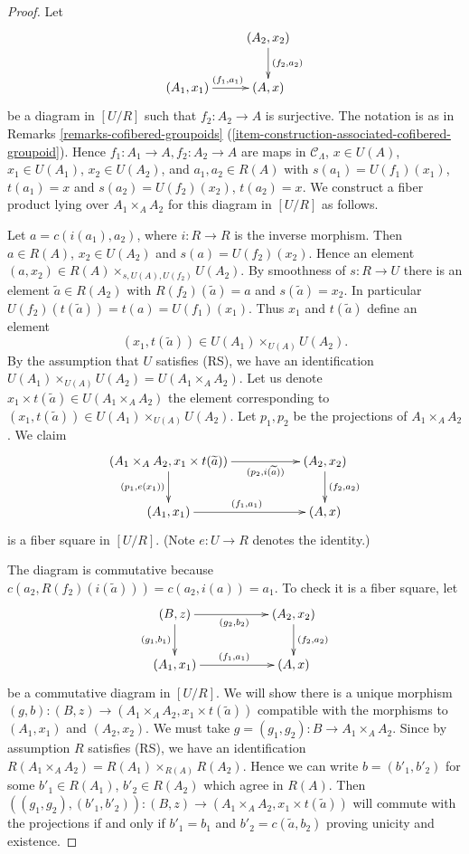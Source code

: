 \documentclass[10pt,a4paper]{amsart}
\theoremstyle{plain}
\theoremstyle{definition}
\theoremstyle{remark}
\numberwithin{equation}{subsection}
\begin{document}
\begin{proof}
Let
$$
\xymatrix{
                           &     (A_2, x_2) \ar[d]^{(f_2, a_2)} \\
(A_1, x_1) \ar[r]^{(f_1, a_1)} &     (A, x)
}
$$
be a diagram in $[U/R]$ such that $f_2: A_2 \to A$ is surjective. The
notation is as in
Remarks \ref{remarks-cofibered-groupoids}
(\ref{item-construction-associated-cofibered-groupoid}).
Hence $f_1: A_1 \to A, f_2: A_2 \to A$ are maps in
$\mathcal{C}_\Lambda$, $x \in U(A)$, $x_1 \in U(A_1)$, $x_2 \in U(A_2)$,
and $a_1, a_2 \in R(A)$ with $s(a_1) = U(f_1)(x_1)$,
$t(a_1) = x$ and $s(a_2) = U(f_2)(x_2)$, $t(a_2) = x$.
We construct a fiber product lying over $A_1 \times_A A_2$
for this diagram in $[U/R]$ as follows.

\medskip\noindent
Let $a = c(i(a_1), a_2)$, where $i: R \to R$ is the inverse morphism.
Then $a \in R(A)$, $x_2 \in U(A_2)$ and $s(a) = U(f_2)(x_2)$.
Hence an element $(a, x_2) \in R(A) \times_{s, U(A), U(f_2)} U(A_2)$.
By smoothness of $s : R \to U$ there is an element
$\widetilde{a} \in R(A_2)$ with $R(f_2)(\widetilde{a}) = a$ and
$s(\widetilde{a}) = x_2$. In particular
$U(f_2)(t(\widetilde{a})) = t(a) = U(f_1)(x_1)$. Thus $x_1$ and
$t(\widetilde{a})$ define an element
$$
(x_1, t(\widetilde{a})) \in U(A_1) \times_{U(A)} U(A_2).
$$
By the assumption that $U$ satisfies (RS), we have an identification
$U(A_1) \times_{U(A)} U(A_2) = U(A_1 \times_A A_2)$. Let us denote
$x_1 \times t(\widetilde{a}) \in U(A_1 \times_A A_2)$ the element
corresponding to $(x_1, t(\widetilde{a})) \in U(A_1) \times_{U(A)} U(A_2)$.
Let $p_1, p_2$ be the projections of $A_1 \times_A A_2$.  We claim
$$
\xymatrix{
(A_1 \times_A A_2, x_1 \times t(\widetilde{a})) \ar[d]_{(p_1, e(x_1))}
\ar[rr]_-{(p_2, i(\widetilde{a}))} & & (A_2, x_2) \ar[d]^{(f_2, a_2)} \\
(A_1, x_1) \ar[rr]^{(f_1, a_1)} & & (A, x)
}
$$
is a fiber square in $[U/R]$. (Note $e: U \to R$ denotes the identity.)

\medskip\noindent
The diagram is commutative because
$c(a_2, R(f_2)(i(\widetilde{a}))) = c(a_2, i(a)) = a_1$.
To check it is a fiber square, let
$$
\xymatrix{
(B, z) \ar[d]_{(g_1, b_1)} \ar[rr]_{(g_2, b_2)} & & (A_2, x_2)
\ar[d]^{(f_2, a_2)} \\
(A_1, x_1) \ar[rr]^{(f_1, a_1)} & & (A, x)
}
$$
be a commutative diagram in $[U/R]$. We will show there is a unique morphism
$(g, b) : (B, z) \to (A_1 \times_A A_2, x_1 \times t(\widetilde{a}))$
compatible with the morphisms to $(A_1, x_1)$ and $(A_2, x_2)$.
We must take $g = (g_1, g_2) : B \to A_1 \times_A A_2$.
Since by assumption $R$ satisfies (RS), we have an identification
$R(A_1 \times_A A_2) = R(A_1) \times_{R(A)} R(A_2)$.
Hence we can write $b = (b'_1, b'_2)$ for some
$b'_1 \in R(A_1)$, $b'_2 \in R(A_2)$ which agree in $R(A)$.
Then
$((g_1, g_2), (b'_1, b'_2)) : (B, z) \to
(A_1 \times_A A_2, x_1 \times t(\widetilde{a}))$
will commute with the projections if and only if
$b'_1 = b_1$ and $b'_2 = c(\widetilde{a}, b_2)$ proving unicity and
existence.
\end{proof}
\end{document}
